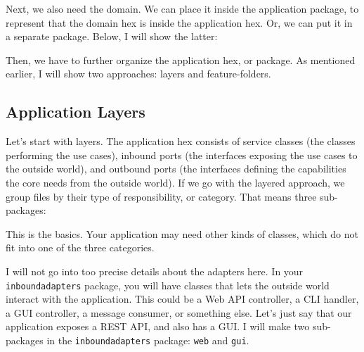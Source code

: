 Next, we also need the domain. We can place it inside the application package, to represent that the domain hex is inside the application hex. Or, we can put it in a separate package. Below, I will show the latter:

\begin{figure}[h]
\centering
\begin{minipage}{0.8\textwidth}
\end{minipage}
\end{figure}

Then, we have to further organize the application hex, or package. As mentioned earlier, I will show two approaches: layers and feature-folders.

\subsection{Application Layers}

Let's start with layers. The application hex consists of service classes (the classes performing the use cases), inbound ports (the interfaces exposing the use cases to the outside world), and outbound ports (the interfaces defining the capabilities the core needs from the outside world). If we go with the layered approach, we group files by their type of responsibility, or category. That means three sub-packages:

\begin{figure}[h]
\centering
\begin{minipage}{0.8\textwidth}
\end{minipage}
\end{figure}

This is the basics. Your application may need other kinds of classes, which do not fit into one of the three categories. 

I will not go into too precise details about the adapters here. In your \texttt{inboundadapters} package, you will have classes that lets the outside world interact with the application. This could be a Web API controller, a CLI handler, a GUI controller, a message consumer, or something else. Let's just say that our application exposes a REST API, and also has a GUI. I will make two sub-packages in the \texttt{inboundadapters} package: \texttt{web} and \texttt{gui}.


